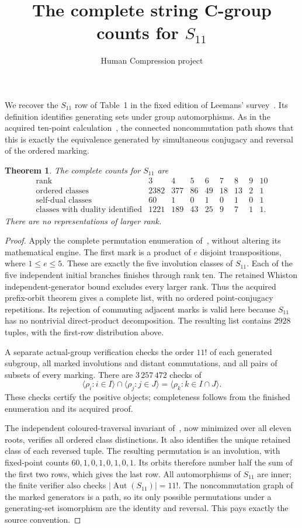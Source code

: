 \documentclass[10pt,a4paper]{article}
\title{The complete string C-group counts for $S_{11}$}
\author{Human Compression project}\date{}
\newtheorem{theorem}{Theorem}
\begin{document}
\maketitle
We recover the $S_{11}$ row of Table~1 in the fixed edition of
Leemans' survey~\cite{survey}.  Its definition identifies generating
sets under group automorphisms.  As in the acquired ten-point
calculation~\cite{ten}, the connected noncommutation path shows
that this is exactly the equivalence generated by simultaneous
conjugacy and reversal of the ordered marking.

\begin{theorem}
The complete counts for $S_{11}$ are
\[
\begin{array}{c|rrrrrrrr}
\text{rank}&3&4&5&6&7&8&9&10\\\hline
\text{ordered classes}&2382&377&86&49&18&13&2&1\\
\text{self-dual classes}&60&1&0&1&0&1&0&1\\
\text{classes with duality identified}&1221&189&43&25&9&7&1&1.
\end{array}
\]
There are no representations of larger rank.
\end{theorem}
\begin{proof}
Apply the complete permutation enumeration of~\cite{method}, without
altering its mathematical engine.  The first mark is a product of
$e$ disjoint transpositions, where $1\le e\le5$.  These are exactly
the five involution classes of $S_{11}$.  Each of the five independent
initial branches finishes through rank ten.  The retained Whiston
independent-generator bound excludes every larger rank.  Thus the
acquired prefix-orbit theorem gives a complete list, with no ordered
point-conjugacy repetitions.  Its rejection of commuting adjacent
marks is valid here because $S_{11}$ has no nontrivial direct-product
decomposition.  The resulting list contains $2928$ tuples, with
the first-row distribution above.

A separate actual-group verification checks the order $11!$ of each
generated subgroup, all marked involutions and distant commutations,
and all pairs of subsets of every marking.  There are $3\,257\,472$
checks of
\[
 \langle\rho_i:i\in I\rangle\cap\langle\rho_j:j\in J\rangle
 =\langle\rho_k:k\in I\cap J\rangle.
\]
These checks certify the positive objects; completeness follows from
the finished enumeration and its acquired proof.

The independent coloured-traversal invariant of~\cite{ten}, now
minimized over all eleven roots, verifies all ordered class distinctions.
It also identifies the unique retained class of each reversed tuple.
The resulting permutation is an involution, with fixed-point counts
$60,1,0,1,0,1,0,1$.  Its orbits therefore number half the sum of the
first two rows, which gives the last row.  All automorphisms of
$S_{11}$ are inner; the finite verifier also checks
$|\operatorname{Aut}(S_{11})|=11!$.  The noncommutation graph of
the marked generators is a path, so its only possible permutations
under a generating-set isomorphism are the identity and reversal.
This pays exactly the source convention.
\end{proof}
\end{document}
